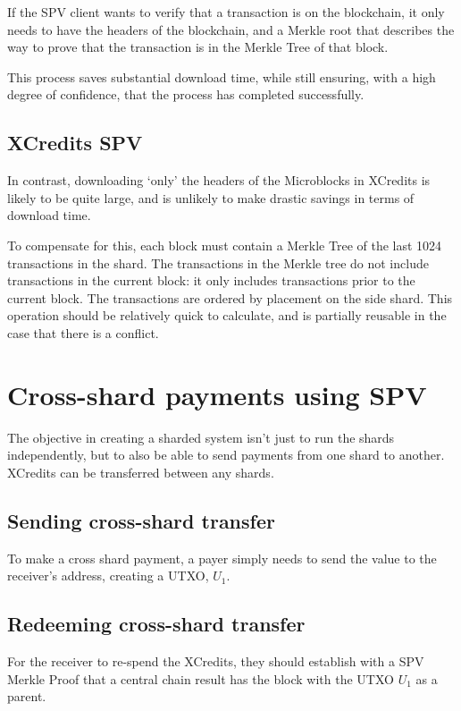 \documentclass[a4paper,12pt]{article}
\begin{document}
If the SPV client wants to verify that a transaction is on the blockchain, it only needs to have the headers of the blockchain, and a Merkle root that describes the way to prove that the transaction is in the Merkle Tree of that block.

This process saves substantial download time, while still ensuring, with a high degree of confidence, that the process has completed successfully. 

\subsection{XCredits SPV}
In contrast, downloading `only' the headers of the Microblocks in XCredits is likely to be quite large, and is unlikely to make drastic savings in terms of download time. 


To compensate for this, each block must contain a Merkle Tree of the last 1024 transactions in the shard. The transactions in the Merkle tree do not include transactions in the current block: it only includes transactions prior to the current block. The transactions are ordered by placement on the side shard. This operation should be relatively quick to calculate, and is partially reusable in the case that there is a conflict.





\section{Cross-shard payments using SPV}
The objective in creating a sharded system isn't just to run the shards independently, but to also be able to send payments from one shard to another. XCredits can be transferred between any shards.

\subsection{Sending cross-shard transfer}
To make a cross shard payment, a payer simply needs to send the value to the receiver's address, creating a UTXO, $U_1$.

\subsection{Redeeming cross-shard transfer}
For the receiver to re-spend the XCredits, they should establish with a SPV Merkle Proof that a central chain result has the block with the UTXO $U_1$ as a parent. 
\end{document}
